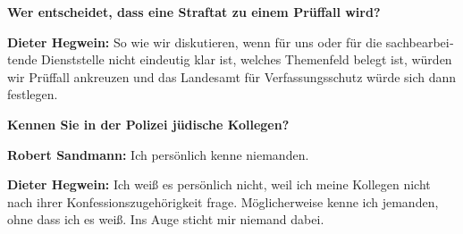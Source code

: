 \begin{otherlanguage}{ngerman}
\textbf{Wer entscheidet, dass eine Straftat zu einem Prüffall wird?}

\textbf{Dieter Hegwein:} So wie wir diskutieren, wenn für uns oder für die sachbearbeitende Dienststelle nicht eindeutig klar ist, welches Themenfeld belegt ist, würden wir Prüffall ankreuzen und das Landesamt für Verfassungsschutz würde sich dann festlegen. 

\textbf{Kennen Sie in der Polizei jüdische Kollegen?}

\textbf{Robert Sandmann:} Ich persönlich kenne niemanden.

\textbf{Dieter Hegwein:} Ich weiß es persönlich nicht, weil ich meine Kollegen nicht nach ihrer Konfessionszugehörigkeit frage. Möglicherweise kenne ich jemanden, ohne dass ich es weiß. Ins Auge sticht mir niemand dabei.

\end{otherlanguage}
